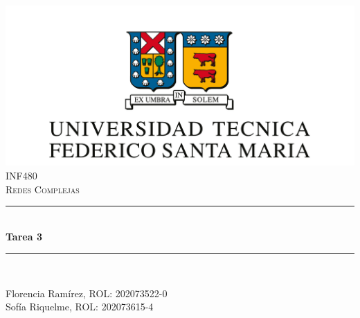 \documentclass[10pt]{article}
\begin{document}
\begin{titlepage}
\newcommand{\HRule}{\rule{\linewidth}{0.5mm}} 
\center

\includegraphics[scale=0.4]{images/logo-usm.png}\\
\vspace{0.6cm}
\textsc{\large INF480}\\[0.5cm] %
\textsc{\Large Redes Complejas}\\[0.5cm] %

\HRule \\[0.4cm]
{ \huge \bfseries Tarea 3}\\[0.4cm] %
\HRule \\[1.5cm]
 
\begin{minipage}{0.8\textwidth}
\begin{center} \large
Florencia Ramírez, ROL: 202073522-0\\
Sofía Riquelme, ROL: 202073615-4
\end{center}

\end{minipage}\\[2cm]

\vfill 

\end{titlepage}
\end{document}
